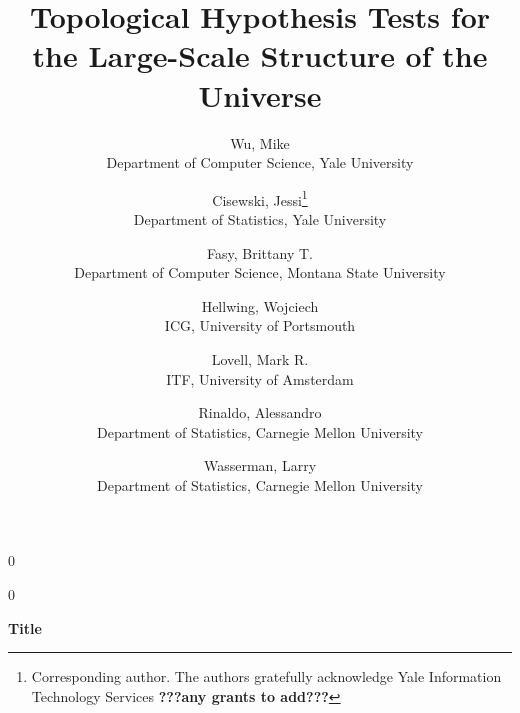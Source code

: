 \documentclass[12pt]{article}
\newcommand{\blind}{0}
\begin{document}
%

\def\spacingset#1{\renewcommand{\baselinestretch}%
{#1}\small\normalsize} \spacingset{1}



\blind
{
  \title{\bf Topological Hypothesis Tests for the Large-Scale Structure of the Universe}
  \author{Wu, Mike\\
    Department of Computer Science, Yale University
    \and
    Cisewski, Jessi\thanks{
    Corresponding author.  The authors gratefully acknowledge Yale Information Technology Services {\bf ???any grants to add???}}\hspace{.2cm}\\
    Department of Statistics, Yale University
    \and
    Fasy, Brittany T.\\
    Department of Computer Science, Montana State University
    \and
    Hellwing, Wojciech\\
    ICG, University of Portsmouth
    \and
    Lovell, Mark R.\\
    ITF, University of Amsterdam
    \and
    Rinaldo, Alessandro\\
    Department of Statistics, Carnegie Mellon University
    \and
    Wasserman, Larry\\
    Department of Statistics, Carnegie Mellon University
  }
  \maketitle
} \fi

\blind
{
  \bigskip
  \bigskip
  \bigskip
  \begin{center}
    {\LARGE\bf Title}
\end{center}
  \medskip
} \fi

\end{document}
